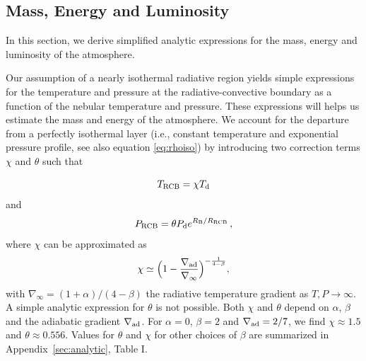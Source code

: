 \documentclass[apj]{emulateapj}
\newcommand{\delad}{\nabla_{\rm ad}}
\newcommand{\App}[1]{Appendix~\ref{#1}}
\newcommand{\di}{_{\rm d}}
\newcommand{\cb}{_{\rm RCB}}
\begin{document}



\subsection{Mass, Energy and Luminosity}
\label{MELan}

In this section, we derive simplified analytic expressions for the mass, energy and luminosity of the atmosphere.

Our assumption of a nearly isothermal radiative region yields simple expressions for the temperature and pressure at the radiative-convective boundary as a function of the nebular temperature and pressure. These expressions will helps us estimate the mass and energy of the atmosphere. We account for the departure from a perfectly isothermal layer (i.e., constant temperature and exponential pressure profile, see also equation \ref{eq:rhoiso}) by introducing two correction terms $\chi$ and $\theta$ such that

\begin{equation}
\label{eq:Tcb}
T\cb = \chi T\di
\end{equation} 
and
 \begin{equation}\label{eq:PcbRcb}
P\cb = \theta P_{\rm d} e^{R_{\rm B}/R\cb} \, ,
\end{equation}
where $\chi$ can be approximated as
\begin{equation}
\label{eq:chi}
\chi \simeq \Big(1-\frac{\delad}{\nabla_{\infty}} \Big)^{-\frac{1}{4-\beta}} ,
\end{equation}
with $\nabla_{\infty}=(1+\alpha)/(4-\beta)$ the radiative temperature gradient as $T, P \rightarrow \infty$. A simple analytic expression for $\theta$ is not possible. Both $\chi$ and $\theta$ depend on $\alpha$, $\beta$ and the adiabatic gradient $\delad$. For $\alpha=0$, $\beta=2$ and $\delad=2/7$, we find $\chi \approx 1.5$ and $\theta \approx 0.556$. Values for $\theta$ and $\chi$ for other choices of $\beta$ are summarized in \App{sec:analytic}, Table I. 
\end{document}
